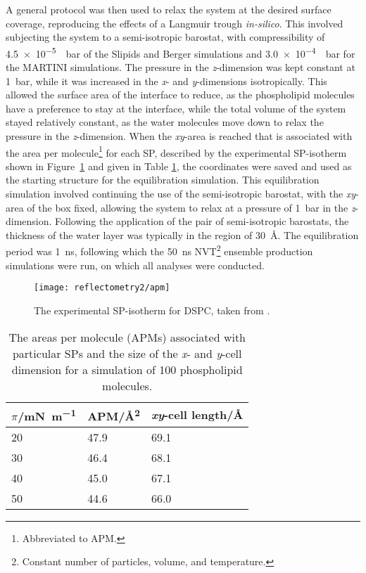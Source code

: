 A general protocol was then used to relax the system at the desired surface coverage, reproducing the effects of a Langmuir trough \emph{in-silico}.
This involved subjecting the system to a semi-isotropic barostat, with compressibility of \SI{4.5e-5}{\per\bar} of the Slipids and Berger simulations and \SI{3.0e-4}{\per\bar} for the MARTINI simulations.
The pressure in the \emph{z}-dimension was kept constant at \SI{1}{\bar}, while it was increased in the \emph{x}- and \emph{y}-dimensions isotropically.
This allowed the surface area of the interface to reduce, as the phospholipid molecules have a preference to stay at the interface, while the total volume of the system stayed relatively constant, as the water molecules move down to relax the pressure in the \emph{z}-dimension.
When the \emph{xy}-area is reached that is associated with the area per molecule\footnote{Abbreviated to APM.} for each SP, described by the experimental SP-isotherm shown in Figure~\ref{fig:surfiso} and given in Table \ref{tab:apm}, the coordinates were saved and used as the starting structure for the equilibration simulation.
This equilibration simulation involved continuing the use of the semi-isotropic barostat, with the \emph{xy}-area of the box fixed, allowing the system to relax at a pressure of \SI{1}{\bar} in the \emph{z}-dimension.
Following the application of the pair of semi-isotropic barostats, the thickness of the water layer was typically in the region of \SI{30}{\angstrom}.
The equilibration period was \SI{1}{\nano\second}, following which the \SI{50}{\nano\second} NVT\footnote{Constant number of particles, volume, and temperature.} ensemble production simulations were run, on which all analyses were conducted.
%
\begin{figure}[t]
    \centering
    \texttt{[image: reflectometry2/apm]}
    \caption{The experimental SP-isotherm for DSPC, taken from \cite{kubo_phosphatidylcholine_2001}.}
    \label{fig:surfiso}
\end{figure}
%
%
\begin{table}[b]
    \centering
    \small
    \caption{The areas per molecule (APMs) associated with particular SPs and the size of the \emph{x}- and \emph{y}-cell dimension for a simulation of 100 phospholipid molecules.}
    \label{tab:apm}
    \begin{tabular}{l | l l}
        \toprule
        $\pi$/\si{\milli\newton\per\meter} & APM/\si{\angstrom\squared} & \emph{xy}-cell length/\si{\angstrom} \\
        \midrule
        \num{20} & \num{47.9} & \num{69.1} \\
        \num{30} & \num{46.4} & \num{68.1} \\
        \num{40} & \num{45.0} & \num{67.1} \\
        \num{50} & \num{44.6} & \num{66.0} \\
        \bottomrule
    \end{tabular}
\end{table}
%
